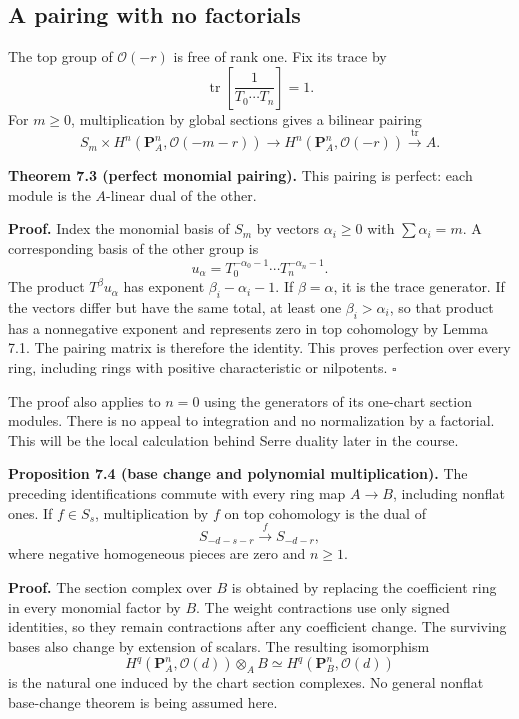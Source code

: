 \documentclass[11pt,a4paper,openany]{report}
\begin{document}
\subsection{A pairing with no factorials}\label{AG-RG-S01-a-pairing-with-no-factorials}

The top group of \(\mathcal O(-r)\) is free of rank one. Fix its trace by \[
\operatorname{tr}\left[\frac1{T_0\cdots T_n}\right]=1.
\] For \(m\ge0\), multiplication by global sections gives a bilinear pairing \[
S_m\times H^n(\mathbf P_A^n,\mathcal O(-m-r))
\longrightarrow H^n(\mathbf P_A^n,\mathcal O(-r))
\xrightarrow{\operatorname{tr}}A.
\]

\textbf{Theorem 7.3 (perfect monomial pairing).} This pairing is perfect: each module is the \(A\)-linear dual of the other.

\textbf{Proof.} Index the monomial basis of \(S_m\) by vectors \(\alpha_i\ge0\) with \(\sum\alpha_i=m\). A corresponding basis of the other group is \[
u_\alpha=T_0^{-\alpha_0-1}\cdots T_n^{-\alpha_n-1}.
\] The product \(T^\beta u_\alpha\) has exponent \(\beta_i-\alpha_i-1\). If \(\beta=\alpha\), it is the trace generator. If the vectors differ but have the same total, at least one \(\beta_i>\alpha_i\), so that product has a nonnegative exponent and represents zero in top cohomology by Lemma 7.1. The pairing matrix is therefore the identity. This proves perfection over every ring, including rings with positive characteristic or nilpotents. \(\square\)

The proof also applies to \(n=0\) using the generators of its one-chart section modules. There is no appeal to integration and no normalization by a factorial. This will be the local calculation behind Serre duality later in the course.

\textbf{Proposition 7.4 (base change and polynomial multiplication).} The preceding identifications commute with every ring map \(A\to B\), including nonflat ones. If \(f\in S_s\), multiplication by \(f\) on top cohomology is the dual of \[
S_{-d-s-r}\xrightarrow{\ f\ }S_{-d-r},
\] where negative homogeneous pieces are zero and \(n\ge1\).

\textbf{Proof.} The section complex over \(B\) is obtained by replacing the coefficient ring in every monomial factor by \(B\). The weight contractions use only signed identities, so they remain contractions after any coefficient change. The surviving bases also change by extension of scalars. The resulting isomorphism \[
H^q(\mathbf P_A^n,\mathcal O(d))\otimes_A B
\simeq H^q(\mathbf P_B^n,\mathcal O(d))
\] is the natural one induced by the chart section complexes. No general nonflat base-change theorem is being assumed here.
\end{document}
